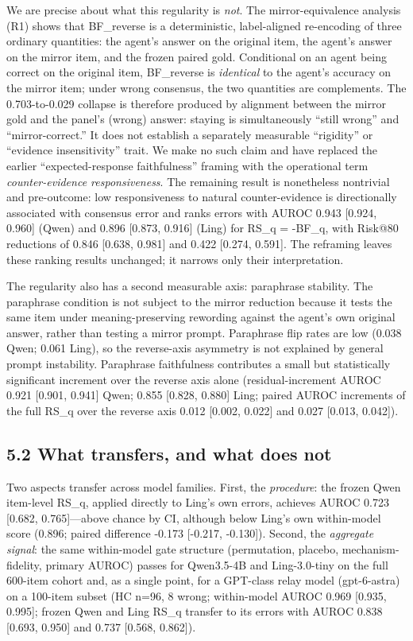 \documentclass[11pt]{article}
\begin{document}
We are precise about what this regularity is \emph{not}. The mirror-equivalence analysis (R1) shows that BF\_reverse is a deterministic, label-aligned re-encoding of three ordinary quantities: the agent's answer on the original item, the agent's answer on the mirror item, and the frozen paired gold. Conditional on an agent being correct on the original item, BF\_reverse is \emph{identical} to the agent's accuracy on the mirror item; under wrong consensus, the two quantities are complements. The 0.703-to-0.029 collapse is therefore produced by alignment between the mirror gold and the panel's (wrong) answer: staying is simultaneously “still wrong” and “mirror-correct.” It does not establish a separately measurable “rigidity” or “evidence insensitivity” trait. We make no such claim and have replaced the earlier “expected-response faithfulness” framing with the operational term \emph{counter-evidence responsiveness}. The remaining result is nonetheless nontrivial and pre-outcome: low responsiveness to natural counter-evidence is directionally associated with consensus error and ranks errors with AUROC 0.943 [0.924, 0.960] (Qwen) and 0.896 [0.873, 0.916] (Ling) for RS\_q = -BF\_q, with Risk@80 reductions of 0.846 [0.638, 0.981] and 0.422 [0.274, 0.591]. The reframing leaves these ranking results unchanged; it narrows only their interpretation.

The regularity also has a second measurable axis: paraphrase stability. The paraphrase condition is not subject to the mirror reduction because it tests the same item under meaning-preserving rewording against the agent's own original answer, rather than testing a mirror prompt. Paraphrase flip rates are low (0.038 Qwen; 0.061 Ling), so the reverse-axis asymmetry is not explained by general prompt instability. Paraphrase faithfulness contributes a small but statistically significant increment over the reverse axis alone (residual-increment AUROC 0.921 [0.901, 0.941] Qwen; 0.855 [0.828, 0.880] Ling; paired AUROC increments of the full RS\_q over the reverse axis 0.012 [0.002, 0.022] and 0.027 [0.013, 0.042]).

\subsection{5.2 What transfers, and what does not}

Two aspects transfer across model families. First, the \emph{procedure}: the frozen Qwen item-level RS\_q, applied directly to Ling's own errors, achieves AUROC 0.723 [0.682, 0.765]—above chance by CI, although below Ling's own within-model score (0.896; paired difference -0.173 [-0.217, -0.130]). Second, the \emph{aggregate signal}: the same within-model gate structure (permutation, placebo, mechanism-fidelity, primary AUROC) passes for Qwen3.5-4B and Ling-3.0-tiny on the full 600-item cohort and, as a single point, for a GPT-class relay model (gpt-6-astra) on a 100-item subset (HC n=96, 8 wrong; within-model AUROC 0.969 [0.935, 0.995]; frozen Qwen and Ling RS\_q transfer to its errors with AUROC 0.838 [0.693, 0.950] and 0.737 [0.568, 0.862]).
\end{document}
